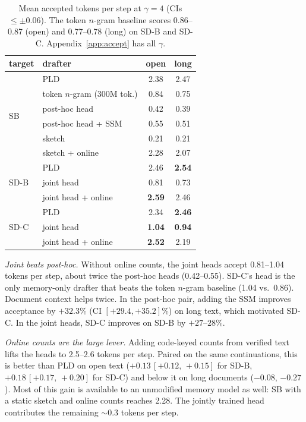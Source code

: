 \documentclass[11pt]{article}
\newcommand{\SB}{\textsc{SB}}
\newcommand{\SDB}{\textsc{SD-B}}
\newcommand{\SDC}{\textsc{SD-C}}
\newcommand{\PLD}{\textsc{PLD}}
\newcommand{\ci}[2]{\,{\scriptstyle[#1,\,#2]}}  %
\begin{document}
\begin{table}[t]
\centering
\small
\setlength{\tabcolsep}{3pt}
\begin{tabular}{llcc}
\toprule
target & drafter & open & long \\
\midrule
\multirow{6}{*}{\SB} & \PLD{} \citep{saxena2023pld} & 2.38 & 2.47 \\
 & token $n$-gram (300M tok.) & 0.84 & 0.75 \\
 & post-hoc head & 0.42 & 0.39 \\
 & post-hoc head + SSM & 0.55 & 0.51 \\
 & sketch & 0.21 & 0.21 \\
 & sketch + online & 2.28 & 2.07 \\
\midrule
\multirow{3}{*}{\SDB} & \PLD & 2.46 & \textbf{2.54} \\
 & joint head & 0.81 & 0.73 \\
 & joint head + online & \textbf{2.59} & 2.46 \\
\midrule
\multirow{3}{*}{\SDC} & \PLD & 2.34 & \textbf{2.46} \\
 & joint head & \textbf{1.04} & \textbf{0.94} \\
 & joint head + online & \textbf{2.52} & 2.19 \\
\bottomrule
\end{tabular}
\caption{Mean accepted tokens per step at $\gamma{=}4$ (CIs $\le\pm0.06$). The token $n$-gram baseline scores
0.86--0.87 (open) and 0.77--0.78 (long) on \SDB{} and \SDC. Appendix~\ref{app:accept} has all $\gamma$.}
\label{tab:accept}
\end{table}

\emph{Joint beats post-hoc.} Without online counts, the joint heads accept 0.81--1.04 tokens per step, about twice the
post-hoc heads (0.42--0.55). \SDC's head is the only memory-only drafter that beats the token $n$-gram baseline (1.04 vs.\
0.86). Document context helps twice. In the post-hoc pair, adding the SSM improves acceptance by $+32.3\%$ (CI
$[+29.4,+35.2]\%$) on long text, which motivated \SDC. In the joint heads, \SDC{} improves on \SDB{} by $+27$--$28\%$.

\emph{Online counts are the large lever.} Adding code-keyed counts from verified text lifts the heads to 2.5--2.6 tokens
per step. Paired on the same continuations, this is better than \PLD{} on open text ($+0.13\ci{+0.12}{+0.15}$ for \SDB,
$+0.18\ci{+0.17}{+0.20}$ for \SDC) and below it on long documents ($-0.08$, $-0.27$). Most of this gain is available to an
unmodified memory model as well: \SB{} with a static sketch and online counts reaches 2.28. The jointly trained head
contributes the remaining ${\sim}0.3$ tokens per step.
\end{document}
